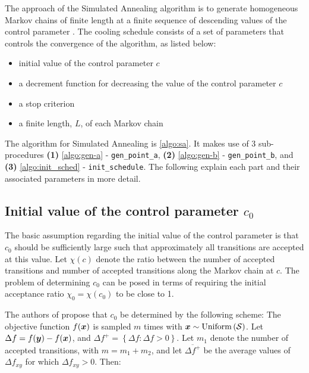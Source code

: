 \hspace*{3mm}The approach of the Simulated Annealing algorithm is to generate homogeneous Markov chains of finite length at a finite sequence of descending values of the control parameter \cite{dekkers}. The cooling schedule consists of a set of parameters that controls the convergence of the algorithm, as listed below: \\
\begin{itemize}
\item initial value of the control parameter $c$ 
\item a decrement function for decreasing the value of the control parameter $c$
\item a stop criterion
\item a finite length, $L$, of each Markov chain \cite{dekkers}   
\end{itemize}

The algorithm for Simulated Annealing is \cref{algo:sa}. It makes use of 3 sub-procedures \textbf{(1)} \cref{algo:gen-a}
 - \texttt{gen\_point\_a}, \textbf{(2)} \cref{algo:gen-b} - \texttt{gen\_point\_b}, and \textbf{(3)} \cref{algo:init_sched}
  - \texttt{init\_schedule}. The following explain each part and their associated parameters in more detail.

  \subsection{Initial value of the control parameter \texorpdfstring{$c_0$}{c0}}

The basic assumption regarding the initial value of the control parameter is that $c_0$ should be sufficiently large such that approximately all transitions are accepted at this value. Let $\chi(c)$ denote the ratio between the number of accepted transitions and number of accepted transitions along the Markov chain at $c$. The problem of determining $c_0$ can be posed in terms of requiring
the initial acceptance ratio $\chi_0=\chi(c_0)$ to be close to 1.

The authors of \cite{dekkers} propose that $c_0$ be determined by the following scheme: The objective function $f(\boldsymbol{x})$ is sampled
$m$ times with $\boldsymbol{x} \sim \mathrm{Uniform}\left( \mathcal{S}\right)$. Let $\Delta f = f(\boldsymbol{y}) - f(\boldsymbol{x})$, and
$\Delta f^+ = \left\lbrace \Delta f : \Delta f > 0 \right\rbrace$. Let $m_1$ denote the number of accepted transitions, with
$m=m_1+m_2$, and let $\overline{\Delta f^+}$ be the average values of $\Delta f_{xy}$ for which $\Delta f_{xy}>0$. Then:

